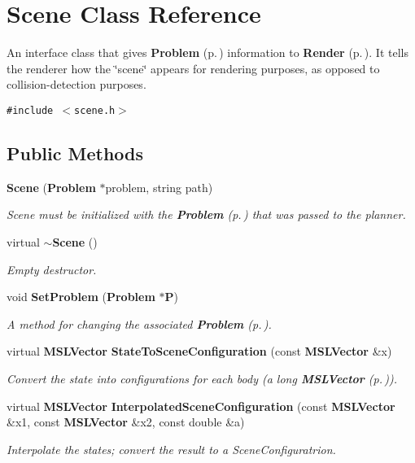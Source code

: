 \section{Scene  Class Reference}
\label{class_Scene}
An interface class that gives {\bf Problem} {\rm (p.\,\pageref{class_Problem})} information to {\bf Render} {\rm (p.\,\pageref{class_Render})}. It tells the renderer how the \char`\"{}scene\char`\"{} appears for rendering purposes, as opposed to collision-detection purposes. 


{\tt \#include $<$scene.h$>$}

\subsection*{Public Methods}
\begin{CompactItemize}
\item 
{\bf Scene} ({\bf Problem} $\ast$problem, string path)
\begin{CompactList}\small\item\em Scene must be initialized with the {\bf Problem} {\rm (p.\,\pageref{class_Problem})} that was passed to the planner.\item\end{CompactList}\item 
virtual {\bf $\sim$Scene} ()
\begin{CompactList}\small\item\em Empty destructor.\item\end{CompactList}\item 
void {\bf Set\-Problem} ({\bf Problem} $\ast${\bf P})
\begin{CompactList}\small\item\em A method for changing the associated {\bf Problem} {\rm (p.\,\pageref{class_Problem})}.\item\end{CompactList}\item 
virtual {\bf MSLVector} {\bf State\-To\-Scene\-Configuration} (const {\bf MSLVector} \&x)
\begin{CompactList}\small\item\em Convert the state into configurations for each body (a long {\bf MSLVector} {\rm (p.\,\pageref{class_MSLVector})}).\item\end{CompactList}\item 
virtual {\bf MSLVector} {\bf Interpolated\-Scene\-Configuration} (const {\bf MSLVector} \&x1, const {\bf MSLVector} \&x2, const double \&a)
\begin{CompactList}\small\item\em Interpolate the states; convert the result to a Scene\-Configuratrion.\item\end{CompactList}\end{CompactItemize}
